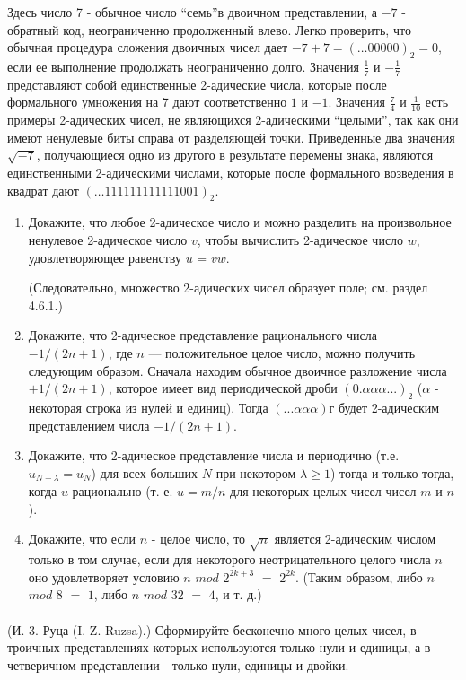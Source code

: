 Здесь число 7 - обычное число \textquotedblleft семь\textquotedblright в двоичном представлении, а $ -7$ - обратный код, неограниченно продолженный влево. Легко проверить, что обычная процедура сложения двоичных чисел дает $ -7 + 7 = ( \ldots 00000)_{2} = 0$, если ее выполнение продолжать неограниченно долго. Значения $\frac{1}{7}$ и $-\frac{1}{7}$ представляют собой единственные 2-адические числа, которые после формального умножения на 7 дают соответственно $1$ и $-1$. Значения $\frac{7}{4}$ и $\frac{1}{10}$ есть примеры 2-адических чисел, не являющихся 2-адическими \textquotedblleft целыми\textquotedblright, так как они имеют ненулевые биты справа от разделяющей точки. Приведенные два значения $\sqrt{-7}$, получающиеся одно из другого в результате перемены знака, являются единственными 2-адическими числами, которые после формального возведения в квадрат
дают $( \ldots  111111111111001)_{2}$.
\begin{enumerate}
\item Докажите, что любое 2-адическое число и можно разделить на произвольное ненулевое 2-адическое число $v$, чтобы вычислить 2-адическое число $w$, удовлетворяющее равенству $u$ = $vw$.\tabn 

\noindent(Следовательно, множество 2-адических чисел образует поле; см. раздел 4.6.1.)
\item Докажите, что 2-адическое представление рационального числа $-1/(2n + 1)$, где $n$ — положительное целое число, можно получить следующим образом. Сначала находим обычное двоичное разложение числа $+1/(2n + 1)$, которое имеет вид периодической дроби $(0.\alpha\alpha\alpha. . .)_{2}$ ($\alpha$ - некоторая строка из нулей и единиц). Тогда $(. . .\alpha\alpha\alpha)г$ будет 2-адическим представлением числа $-1/(2n + 1)$.
\item Докажите, что 2-адическое представление числа и периодично (т.е. $u_{N + \lambda} = u_{N}$) для всех больших $N$ при некотором $\lambda \geq 1$) тогда и только тогда, когда $u$ рационально (т. е. $u = m/n$ для некоторых целых чисел чисел $m$ и $n$).
\item Докажите, что если $n$ - целое число, то $\sqrt{n}$ является 2-адическим числом только в том случае, если для некоторого неотрицательного целого числа $n$ оно удовлетворяет условию $n$ $mod$ $2^{2k + 3} $ $=$ $2^{2k}$. (Таким образом, либо $n$ $mod$ $8$ $=$ $1$, либо $n$ $mod$ $32$ $=$ $4$, и т. д.)
\end{enumerate}

\paragraph{}  (И. 3. Руца (I. Z. Ruzsa).) Сформируйте бесконечно много целых чисел, в троичных представлениях которых используются только нули и единицы, а в четверичном представлении - только нули, единицы и двойки.

